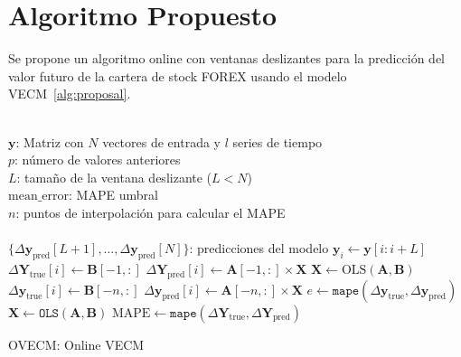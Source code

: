 \section{Algoritmo Propuesto}

Se propone un algoritmo online con ventanas deslizantes para la predicción del
valor futuro de la cartera de stock FOREX usando el modelo VECM~\ref{alg:proposal}. 

\begin{algorithm}[h!]
\begin{algorithmic}[1]
\REQUIRE $\,$ \\
$\mathbf{y}$: Matriz con $N$ vectores de entrada y $l$ series de tiempo\\
$p$: número de valores anteriores \\
$L$: tamaño de la ventana deslizante ($L<N$) \\
$\text{mean\_error}$: MAPE umbral \\
$n$: puntos de interpolación para calcular el MAPE\\
\ENSURE  $\,$ \\
$\{\Delta \mathbf{y}_{\text{pred}}[L+1],\dots,\Delta \mathbf{y}_{\text{pred}}[N]\}$: predicciones del modelo
    \STATE $\mathbf{y}_i \gets \mathbf{y}[i:i+L]$
    \ELSE
        \STATE $\Delta \mathbf{Y}_{\text{true}}[i] \gets \mathbf{B}[-1,:]$
        \STATE $\Delta \mathbf{Y}_{\text{pred}}[i] \gets \mathbf{A}[-1,:] \times \mathbf{X}$
    \ENDIF
    \STATE $\mathbf{X} \gets \text{OLS} (\mathbf{A},\mathbf{B})$
    \STATE $\Delta \mathbf{y}_{\text{true}}[i] \gets \mathbf{B}[-n,:]$
    \STATE $\Delta \mathbf{y}_{\text{pred}}[i] \gets \mathbf{A}[-n,:] \times \mathbf{X}$
    \STATE $e \gets \texttt{mape}(\Delta \mathbf{y}_{\text{true}}, \Delta
    \mathbf{y}_{\text{pred}})$
        \STATE $\mathbf{X} \gets \texttt{OLS} (\mathbf{A},\mathbf{B})$
    \ENDIF
\ENDFOR
\STATE $\text{MAPE} \gets \texttt{mape}(\Delta \mathbf{Y}_{\text{true}}, \Delta
\mathbf{Y}_{\text{pred}})$
\end{algorithmic}
\caption{OVECM: Online VECM}
\label{alg:proposal}
\end{algorithm}


